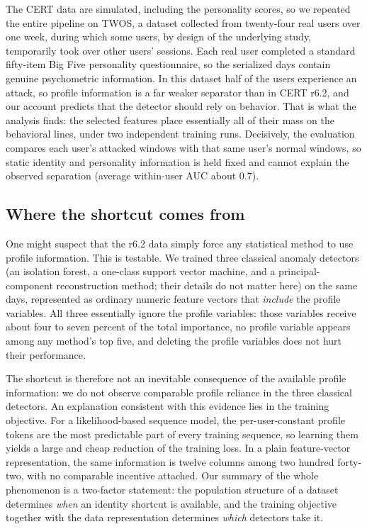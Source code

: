\documentclass[10pt]{article}
\begin{document}
The CERT data are simulated, including the personality scores, so we
repeated the entire pipeline on TWOS, a dataset collected from
twenty-four real users over one week, during which some users, by
design of the underlying study, temporarily took over other users'
sessions. Each real user completed a standard fifty-item Big Five
personality questionnaire, so the serialized days contain genuine
psychometric information. In this dataset half of the users experience
an attack, so profile information is a far weaker separator than in
CERT r6.2, and our account predicts that the detector should rely on
behavior. That is what the analysis finds: the selected features place
essentially all of their mass on the behavioral lines, under two
independent training runs. Decisively, the evaluation compares each
user's attacked windows with that same user's normal windows, so static
identity and personality information is held fixed and cannot explain
the observed separation (average within-user AUC about $0.7$).

\subsection{Where the shortcut comes from}

One might suspect that the r6.2 data simply force any statistical method
to use profile information. This is testable. We trained three classical
anomaly detectors (an isolation forest, a one-class support vector
machine, and a principal-component reconstruction method; their details
do not matter here) on the same days, represented as ordinary numeric
feature vectors that \emph{include} the profile variables. All three
essentially ignore the profile variables: those variables receive about
four to seven percent of the total importance, no profile variable
appears among any method's top five, and deleting the profile variables
does not hurt their performance.

The shortcut is therefore not an inevitable consequence of the
available profile information: we do not observe comparable profile
reliance in the three classical detectors. An explanation consistent
with this evidence lies in the training objective. For a
likelihood-based sequence model, the per-user-constant profile tokens
are the most predictable part of every training sequence, so learning
them yields a large and cheap reduction of the training loss. In
a plain feature-vector representation, the same information is twelve
columns among two hundred forty-two, with no comparable incentive
attached. Our summary of the whole phenomenon is a two-factor statement:
the population structure of a dataset determines \emph{when} an
identity shortcut is available, and the training objective together with
the data representation determines \emph{which} detectors take it.
\end{document}
